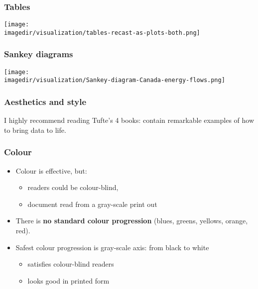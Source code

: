 \begin{frame}\frametitle{Tables}
	\begin{center}
		\texttt{[image: \\imagedir/visualization/tables-recast-as-plots-both.png]}
	\end{center}	
\end{frame}

\begin{frame}\frametitle{Sankey diagrams}
	\begin{center}
		\texttt{[image: \\imagedir/visualization/Sankey-diagram-Canada-energy-flows.png]}
	\end{center}
\end{frame}

% 	

\begin{frame}\frametitle{Aesthetics and style}
	
	I highly recommend reading Tufte's 4 books: contain remarkable examples of how to bring data to life.
\end{frame}

\begin{frame}\frametitle{Colour}
	\begin{itemize}
		\item	Colour is effective, but: 
		\begin{itemize}
			\item	readers could be colour-blind, 
			\item	document read from a gray-scale print out 
		\end{itemize}
	\end{itemize}
	\begin{itemize}
		\item	There is \textbf{no standard colour progression} (blues, greens, yellows, orange, red). 
		\item	Safest colour progression is gray-scale axis: from black to white 
		\begin{itemize}
			\item	satisfies colour-blind readers 
			\item	looks good in printed form 
		\end{itemize}
	\end{itemize}
\end{frame}

